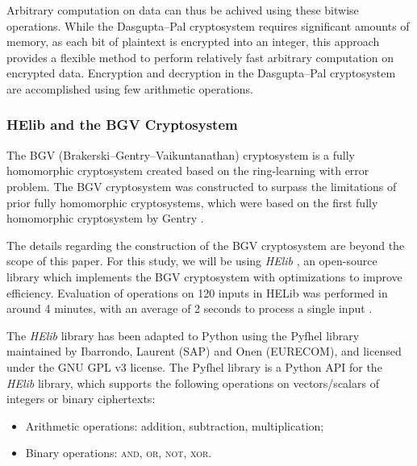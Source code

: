 Arbitrary computation on data can thus be achived using these bitwise operations. While the Dasgupta--Pal cryptosystem requires significant amounts of memory, as each bit of plaintext is encrypted into an integer, this approach provides a flexible method to perform relatively fast arbitrary computation on encrypted data. Encryption and decryption in the Dasgupta--Pal cryptosystem are accomplished using few arithmetic operations.

\subsubsection{HElib and the BGV Cryptosystem}
The BGV (Brakerski--Gentry--Vaikuntanathan) cryptosystem \cite{cryptoeprint:2011:277} is a fully homomorphic cryptosystem created based on the ring-learning with error problem. The BGV cryptosystem was constructed to surpass the limitations of prior fully homomorphic cryptosystems, which were based on the first fully homomorphic cryptosystem by Gentry \cite{gentry_fully_2009}.

The details regarding the construction of the BGV cryptosystem are beyond the scope of this paper. For this study, we will be using \textit{HElib} \cite{garay_algorithms_2014}, an open-source library which implements the BGV cryptosystem with optimizations to improve efficiency. Evaluation of operations on 120 inputs in HELib was performed in around 4 minutes, with an average of 2 seconds to process a single input \cite{hutchison_fully_2010,cryptoeprint:2011:566}.

The \textit{HElib} library has been adapted to Python using the Pyfhel library \cite{pyfhel_2018} maintained by Ibarrondo, Laurent (SAP) and Onen (EURECOM), and licensed under the GNU GPL v3 license. The Pyfhel library is a Python API for the \textit{HElib} library, which supports the following operations on vectors/scalars of integers or binary ciphertexts:
\begin{itemize}
	\item Arithmetic operations: addition, subtraction, multiplication;
	\item Binary operations: \textsc{and}, \textsc{or}, \textsc{not}, \textsc{xor}.
\end{itemize}

